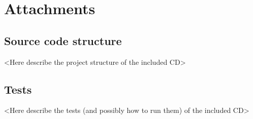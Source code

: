 \documentclass[licencjacka,en]{pracamgr}
\begin{document}
\chapter*{Attachments}\label{r:attachments}

\section*{Source code structure}

<Here describe the project structure of the included CD>


\section*{Tests}

<Here describe the tests (and possibly how to run them) of the included CD>
\end{document}
